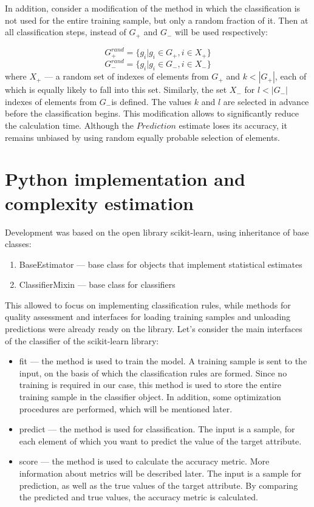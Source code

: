 \documentclass{article}
\begin{document}
In addition, consider a modification of the method in which the classification is not used for the entire training sample, but only a random fraction of it. Then at all classification steps, instead of $G_+$ and $G_-$ will be used respectively:

$$G_+^{rand} = \{ g_i | g_i \in G_+, i \in X_+\}$$
$$G_-^{rand} = \{ g_i | g_i \in G_-, i \in X_-\}$$
where $X_+$ --- a random set of indexes of elements from $G_+$ and $k < |G_+|$, each of which is equally likely to fall into this set. Similarly, the set $X_-$ for $l < |G_-|$ indexes of elements from $G_-$is defined. The values $k$ and $l$ are selected in advance before the classification begins. This modification allows to significantly reduce the calculation time. Although the $Prediction$ estimate loses its accuracy, it remains unbiased by using random equally probable selection of elements.

\section{Python implementation and complexity estimation}

Development was based on the open library scikit-learn, using inheritance of base classes:

\begin{enumerate}
    \item BaseEstimator --- base class for objects that implement statistical estimates
    \item ClassifierMixin --- base class for classifiers
\end{enumerate}

This allowed to focus on implementing classification rules, while methods for quality assessment and interfaces for loading training samples and unloading predictions were already ready on the library. Let's consider the main interfaces of the classifier of the scikit-learn library:

\begin{itemize}
    \item fit --- the method is used to train the model. A training sample is sent to the input, on the basis of which the classification rules are formed. Since no training is required in our case, this method is used to store the entire training sample in the classifier object. In addition, some optimization procedures are performed, which will be mentioned later.
    \item predict --- the method is used for classification. The input is a sample, for each element of which you want to predict the value of the target attribute.
    \item score --- the method is used to calculate the accuracy metric.  More information about metrics will be described later. The input is a sample for prediction, as well as the true values of the target attribute. By comparing the predicted and true values, the accuracy metric is calculated.
\end{itemize}
\end{document}
